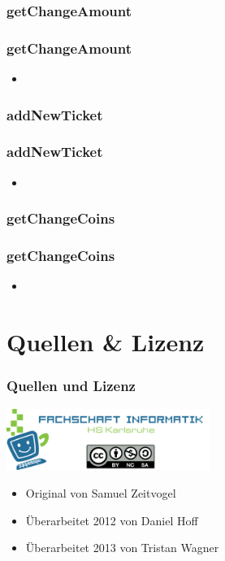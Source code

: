\documentclass[final]{beamer}
\begin{document}
\subsubsection{getChangeAmount}
\begin{frame}
	\frametitle{getChangeAmount}
	\begin{itemize}
		\item{}
	\end{itemize}
\end{frame}

\subsubsection{addNewTicket}
\begin{frame}
	\frametitle{addNewTicket}
	\begin{itemize}
		\item{}
	\end{itemize}
\end{frame}

\subsubsection{getChangeCoins}
\begin{frame}
	\frametitle{getChangeCoins}
	\begin{itemize}
		\item{}
	\end{itemize}
\end{frame}

\section{Quellen \& Lizenz}
\begin{frame}
	\frametitle{Quellen und Lizenz}
	\begin{center}
		\includegraphics[width=250px]{gfx/fsi}
	\end{center}
	\begin{itemize}
		\item{Original von Samuel Zeitvogel}
		\item{Überarbeitet 2012 von Daniel Hoff}
		\item{Überarbeitet 2013 von Tristan Wagner}
	\end{itemize}
\end{frame}
\end{document}
